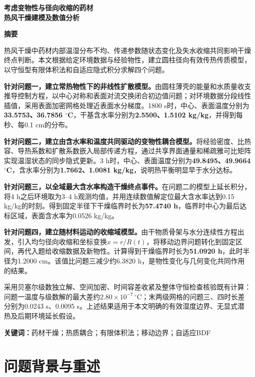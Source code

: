 \begin{center}
{\bfseries 考虑变物性与径向收缩的药材\\[5pt]热风干燥建模及数值分析}
\end{center}
\vspace{3pt}
\begin{center}\bfseries 摘\quad 要\end{center}
热风干燥中药材内部温湿分布不均、传递参数随状态变化及失水收缩共同影响干燥终点判断。本文根据给定环境数据与经验物性，建立圆柱径向有效传热传质模型，以守恒型有限体积法和自适应隐式积分求解四个问题。

\textbf{针对问题一，建立常热物性下的非线性扩散模型。}由圆柱薄壳的能量和水质量收支推导控制方程，以中心对称和表面对流交换闭合初边值问题；对环境数据分段线性插值，采用表面加密网格处理近表面水分梯度。1800 s时，中心、表面温度分别为\textbf{33.5753、36.7856 $^\circ$C}，干基含水率分别为\textbf{2.5500、1.5102 kg/kg}，并得到每秒、每0.1 cm的分布。

\textbf{针对问题二，建立由含水率和温度共同驱动的变物性耦合模型。}将经验密度、比热容、导热系数和扩散系数嵌入局部传递方程，通过共享界面通量和稀疏雅可比矩阵实现温湿状态的同步隐式更新。3 h时，中心、表面温度分别为\textbf{49.8495、49.9664 $^\circ$C}，含水率分别为\textbf{1.7662、1.0081 kg/kg}，说明热平衡明显早于水分达标。

\textbf{针对问题三，以全域最大含水率构造干燥终点事件。}在问题二的模型上延长积分，将4 h之后环境取为3--4 h观测均值，并用连续数值解定位最大含水率达到0.15 kg/kg的时刻。得到固定半径下干燥临界时长为\textbf{57.4740 h}，临界时中心为最后达标区域，表面含水率为0.0526 kg/kg。

\textbf{针对问题四，建立随材料运动的收缩域模型。}由干物质骨架与水分连续性方程出发，引入均匀径向收缩和坐标变换$x=r/R(t)$，将移动边界问题转化到固定区间，再代入题给收缩数据及新物性。计算得到干燥临界时长为\textbf{51.0920 h}，此时半径为1.2000 cm。该值比问题三减少约6.3820 h，是物性变化与几何变化共同作用的结果。

采用贝塞尔级数独立解、空间加密、时间容差收紧及整体守恒检查核验既有计算：问题一温度与级数解的最大差约$2.80\times10^{-7}\,^\circ$C；末两级网格的问题三、四时长差分别为0.0243 s、0.0095 s。上述结果适用于本文明确的有效湿度边界、无显式潜热及后期环境延长假设。

\vspace{5pt}
\noindent\textbf{关键词：}药材干燥；热质耦合；有限体积法；移动边界；自适应BDF

\nextpage
\section{问题背景与重述}
